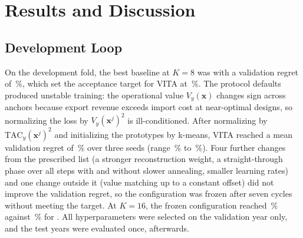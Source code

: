\documentclass[journal]{IEEEtran}
\begin{document}
\section{Results and Discussion}\label{sec:results}

\subsection{Development Loop}
On the development fold, the best baseline at $K=8$ was \DevBestBaseNameKeight{} with a validation regret of \DevBestBaseKeight\,\%, which set the acceptance target for VITA at \DevTargetKeight\,\%. The protocol defaults produced unstable training: the operational value $V_y(\bm{x})$ changes sign across anchors because export revenue exceeds import cost at near-optimal designs, so normalizing the loss by $V_y(\bm{x}^{j})^2$ is ill-conditioned. After normalizing by $\mathrm{TAC}_y(\bm{x}^{j})^2$ and initializing the prototypes by k-means, VITA reached a mean validation regret of \DevVITAKeight\,\% over three seeds (range \DevVITAMinKeight\,\% to \DevVITAMaxKeight\,\%). Four further changes from the prescribed list (a stronger reconstruction weight, a straight-through phase over all steps with and without slower annealing, smaller learning rates) and one change outside it (value matching up to a constant offset) did not improve the validation regret, so the configuration was frozen after seven cycles without meeting the target. At $K=16$, the frozen configuration reached \DevVITAKsixteen\,\% against \DevBestBaseKsixteen\,\% for \DevBestBaseNameKsixteen. All hyperparameters were selected on the validation year only, and the test years were evaluated once, afterwards.



\end{document}
